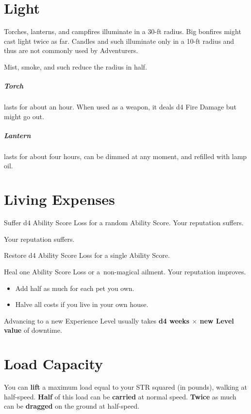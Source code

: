 \documentclass[itdr/core]{subfiles}
\begin{document}
\vfill

\section{Light}

Torches, lanterns, and campfires illuminate in a \mbox{30-ft} radius. Big bonfires might cast light twice as far. Candles and such illuminate only in a 10-ft radius and thus are not commonly used by Adventurers.

Mist, smoke, and such reduce the radius in half.

\subparagraph{Torch} lasts for about an hour. When used as a weapon, it deals d4 Fire Damage but might go out.

\subparagraph{Lantern} lasts for about four hours, can be dimmed at any moment, and refilled with lamp oil.

\vfill

\section{Living Expenses}

Suffer d4 Ability Score Loss for a random Ability Score. Your reputation suffers.

Your reputation suffers.

Restore d4 Ability Score Loss for a single Ability Score.

Heal one Ability Score Loss or a~non-magical ailment. Your reputation improves.

\begin{itemize}
	\item Add half as much for each pet you own.
	\item Halve all costs if you live in your own house.
\end{itemize}

Advancing to a new Experience Level usually takes \textbf{d4 weeks $\times$ new Level value} of downtime.




\section{Load Capacity}

You can \textbf{lift} a maximum load equal to your STR squared (in pounds), walking at half-speed. \textbf{Half} of this load can be \textbf{carried} at normal speed. \textbf{Twice} as much can be \textbf{dragged} on the ground at half-speed.
\end{document}
